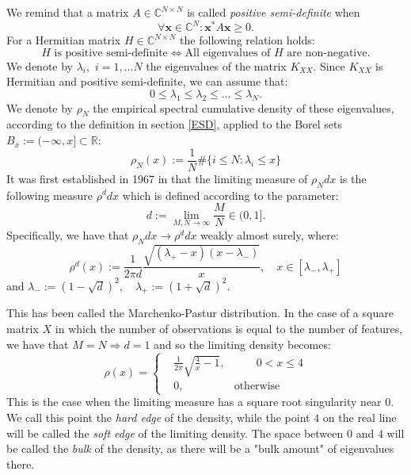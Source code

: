 \documentclass[11pt, a4paper, oneside]{book}
\numberwithin{equation}{chapter}
\newcommand{\beq}{\begin{equation}}
\newcommand{\eeq}{\end{equation}}
\begin{document}
We remind that a matrix $A \in \mathbb{C}^{N \times N}$ is called \textit{positive semi-definite} when
%
\[
\forall \mathbf{x} \in \mathbb{C}^N : \mathbf{x}^* A \mathbf{x} \geq 0.
\]
%
For a Hermitian matrix $H \in \mathbb{C}^{N \times N}$ the following relation holds:
%
\[
H \textrm{ is positive semi-definite} \Leftrightarrow \textrm{All eigenvalues of } H \textrm{ are non-negative}.
\]
%
We denote by $\lambda_i,$ $i=1,...N$ the eigenvalues of the matrix $K_{XX}.$ Since $K_{XX}$ is Hermitian and positive semi-definite, we can assume that:
\[
0\leq \lambda_1 \leq \lambda_2 \leq ... \leq \lambda_N .
\]
%
We denote by $\rho_N$ the empirical spectral cumulative density of these eigenvalues, according to the definition in section \ref{ESD}, applied to the Borel sets $B_x := (-\infty,x] \subset \mathbb{R}:$
%
\beq \label{rhoN}
\rho_N (x) := \frac{1}{N} \# \{ i \leq N : \lambda_i \leq x \}
\eeq
%
It was first established in 1967 in \cite{marchenko1967distribution} that the limiting measure of $\rho_N dx$ is the following measure $\rho^d dx$ which is defined according to the parameter:
\beq \label{d-param}
d:= \lim \limits_{M,N \to \infty} \frac{M}{N} \in (0,1].
\eeq
%
Specifically, we have that $\rho_N dx \to \rho^d dx$ weakly almost surely, where:
%
\beq \label{M-P}
\rho^d(x) := \frac{1}{2\pi d } \frac{\sqrt{(\lambda_+-x)(x-\lambda_-)}}{ x}, \quad x \in [\lambda_-,\lambda_+]
\eeq
%
and $\lambda_- := (1-\sqrt{d})^2 , \quad \lambda_+ := (1+\sqrt{d})^2 .$

This has been called the Marchenko-Pastur distribution. In the case of a square matrix $X$ in which the number of observations is equal to the number of features, we have that $M=N \Rightarrow d=1$ and so the limiting density becomes:
%
\beq \label{M-P1}
\rho(x) = \left\{
\begin{aligned}
&\frac{1}{2\pi} \sqrt{\frac{4}{x}-1} , & \qquad 0<x\leq 4 \\
&0 , &\textrm{otherwise}
\end{aligned} \right.
\eeq
%
This is the case when the limiting measure has a square root singularity near $0$. We call this point the \textit{hard edge} of the density, while the point $4$ on the real line will be called the \textit{soft edge} of the limiting density. The space between $0$ and $4$ will be called the \textit{bulk} of the density, as there will be a "bulk amount" of eigenvalues there.
\end{document}
